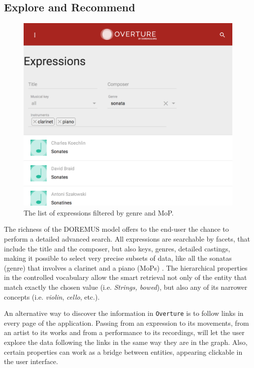 \subsection{Explore and Recommend}
\begin{figure}
 \centerline{
 \includegraphics[width=\columnwidth]{figs/overture_list_2.png}}
 \caption{The list of expressions filtered by genre and MoP.}
 \label{fig:overture-list}
\end{figure}

The richness of the DOREMUS model offers to the end-user the chance to perform a detailed advanced search. All expressions are searchable by facets, that include the title and the composer, but also keys, genres, detailed castings, making it possible to select very precise subsets of data, like all the sonatas (genre) that involves a clarinet and a piano (MoPs) . The hierarchical properties in the controlled vocabulary allow the smart retrieval not only of the entity that match exactly the chosen value (i.e. \textit{Strings, bowed}), but also any of its narrower concepts (i.e. \textit{violin}, \textit{cello}, etc.).

An alternative way to discover the information in \texttt{Overture} is to follow links in every page of the application. Passing from an expression to its movements, from an artist to its works and from a performance to its recordings, will let the user explore the data following the links in the same way they are in the graph. Also, certain properties can work as a bridge between entities, appearing clickable in the user interface.

